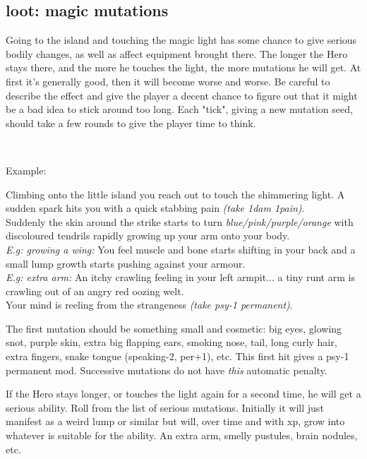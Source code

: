 \subsection*{loot: magic mutations}
Going to the island and touching the magic light has some chance to give serious bodily changes, as well as affect equipment brought there. The longer the Hero stays there, and the more he touches the light, the more mutations he will get. At first it's generally good, then it will become worse and worse. Be careful to describe the effect and give the player a decent chance to figure out that it might be a bad idea to stick around too long. Each "tick", giving a new mutation seed, should take a few rounds to give the player time to think.

\

\noindent Example:
\begin{readoutloud}
Climbing onto the little island you reach out to touch the shimmering light. A sudden spark hits you with a quick stabbing pain \emph{(take 1dam 1pain)}.\\
Suddenly the skin around the strike starts to turn \emph{blue/pink/purple/orange} with discoloured tendrils rapidly growing up your arm onto your body.\\
\emph{E.g: growing a wing:} You feel muscle and bone starts shifting in your back and a small lump growth starts pushing against your armour.\\
\emph{E.g: extra arm:} An itchy crawling feeling in your left armpit... a tiny runt arm is crawling out of an angry red oozing welt.\\
Your mind is reeling from the strangeness \emph{(take psy-1 permanent)}.
\end{readoutloud}

\noindent The first mutation should be something small and cosmetic: big eyes, glowing snot, purple skin, extra big flapping ears, smoking nose, tail, long curly hair, extra fingers, snake tongue (speaking-2, per+1), etc. This first hit gives a psy-1 permanent mod. Successive mutations do not have \emph{this} automatic penalty.

If the Hero stays longer, or touches the light again for a second time, he will get a serious ability. Roll from the list of serious mutations. Initially it will just manifest as a weird lump or similar but will, over time and with xp, grow into whatever is suitable for the ability. An extra arm, smelly pustules, brain nodules, etc.

